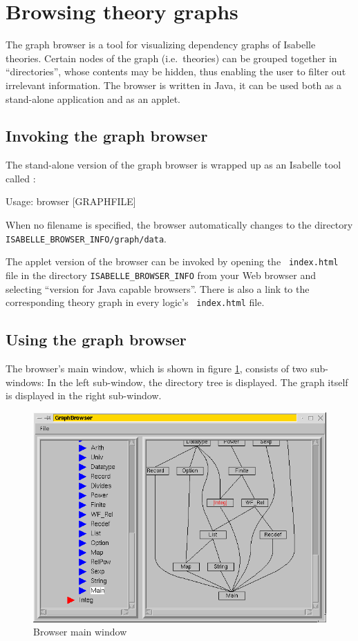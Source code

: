 \section{Browsing theory graphs} \label{sec:browse}

The graph browser is a tool for visualizing dependency graphs of
Isabelle theories. Certain nodes of the graph (i.e.~theories) can be
grouped together in ``directories'', whose contents may be hidden,
thus enabling the user to filter out irrelevant information.  The
browser is written in Java, it can be used both as a stand-alone
application and as an applet.


\subsection{Invoking the graph browser}

The stand-alone version of the graph browser is wrapped up as an
Isabelle tool called :
\begin{ttbox}
Usage: browser [GRAPHFILE]
\end{ttbox}
When no filename is specified, the browser automatically changes to
the directory \texttt{ISABELLE_BROWSER_INFO/graph/data}.

\medskip The applet version of the browser can be invoked by opening the {\tt
  index.html} file in the directory \texttt{ISABELLE_BROWSER_INFO} from your
Web browser and selecting ``version for Java capable browsers''.  There is
also a link to the corresponding theory graph in every logic's {\tt
  index.html} file.


\subsection{Using the graph browser}

The browser's main window, which is shown in figure
\ref{browserwindow}, consists of two sub-windows: In the left
sub-window, the directory tree is displayed. The graph itself is
displayed in the right sub-window.
\begin{figure}[ht]
  \includegraphics[width=\textwidth]{browser_screenshot}
  \caption{\label{browserwindow} Browser main window}
\end{figure}


